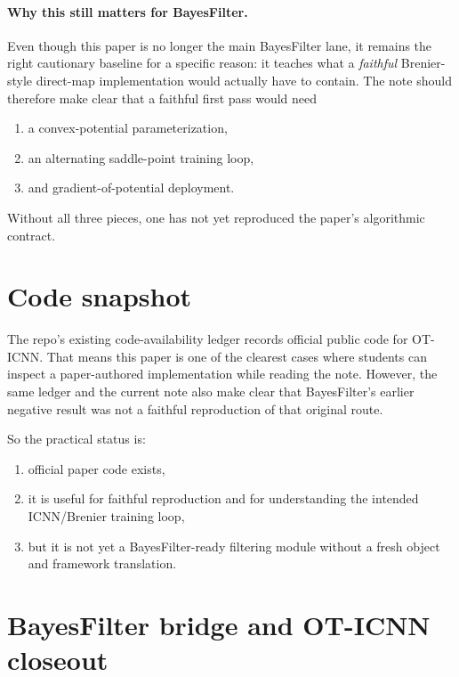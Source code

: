 \documentclass[11pt]{report}
\begin{document}
\paragraph{Why this still matters for BayesFilter.}
Even though this paper is no longer the main BayesFilter lane, it remains the right
cautionary baseline for a specific reason: it teaches what a \emph{faithful}
Brenier-style direct-map implementation would actually have to contain.  The note
should therefore make clear that a faithful first pass would need
\begin{enumerate}[label=(\roman*)]
  \item a convex-potential parameterization,
  \item an alternating saddle-point training loop,
  \item and gradient-of-potential deployment.
\end{enumerate}
Without all three pieces, one has not yet reproduced the paper's algorithmic
contract.

\section{Code snapshot}

The repo's existing code-availability ledger records official public code for
OT-ICNN.  That means this paper is one of the clearest cases where students can
inspect a paper-authored implementation while reading the note.  However, the same
ledger and the current note also make clear that BayesFilter's earlier negative
result was not a faithful reproduction of that original route.

So the practical status is:
\begin{enumerate}[label=(\roman*)]
  \item official paper code exists,
  \item it is useful for faithful reproduction and for understanding the intended ICNN/Brenier training loop,
  \item but it is not yet a BayesFilter-ready filtering module without a fresh object and framework translation.
\end{enumerate}

\section{BayesFilter bridge and OT-ICNN closeout}
\end{document}
